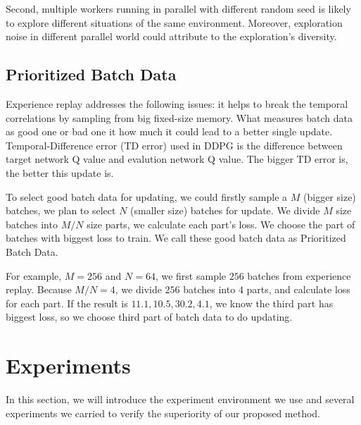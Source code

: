 \documentclass[11pt,twocolumn]{jarticle} %
\begin{document}
Second, multiple workers running in parallel with different random seed is likely to explore different situations of the same environment. Moreover, exploration noise in different parallel world could attribute to the exploration's diversity. \par

\subsection{Prioritized Batch Data}

Experience replay addresses the following issues: it helps to break the temporal correlations by sampling from big fixed-size memory. What measures batch data as good one or bad one it how much it could lead to a better single update. Temporal-Difference error (TD error) used in DDPG is the difference between target network Q value and evalution network Q value. The bigger TD error is, the better this update is. \par

To select good batch data for updating, we could firstly sample a $M$ (bigger size) batches, we plan to select $N$ (smaller size) batches for update. We divide $M$ size batches into $M/N$ size parts, we calculate each part's loss. We choose the part of batches with biggest loss to train. We call these good batch data as Prioritized Batch Data. \par

For example, $M = 256$ and $N = 64$, we first sample $256$ batches from experience replay. Because $M / N = 4$, we divide $256$ batches into $4$ parts, and calculate loss for each part. If the result is {$11.1, 10.5, 30.2, 4.1$}, we know the third part has biggest loss, so we choose third part of batch data to do updating. 

\section{Experiments}
In this section, we will introduce the experiment environment we use and several experiments we carried to verify the superiority of our proposed method.
\end{document}
